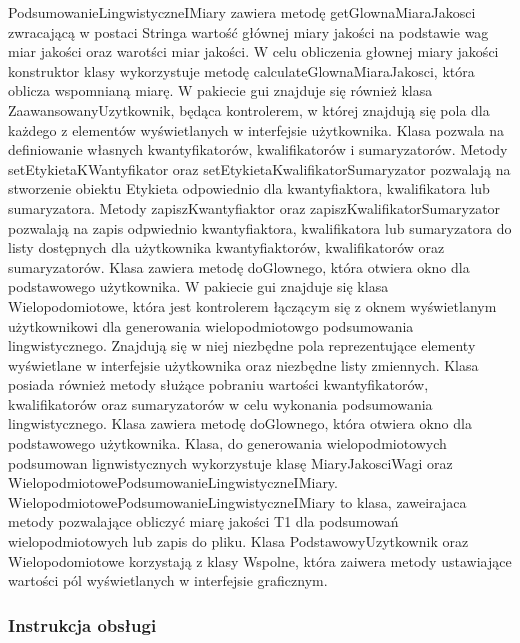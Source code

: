 \documentclass{classrep}
\begin{document}
PodsumowanieLingwistyczneIMiary zawiera metodę getGlownaMiaraJakosci zwracającą w postaci Stringa wartość głównej miary jakości na podstawie wag miar jakości oraz warotści miar jakości. W celu obliczenia głownej miary jakości konstruktor klasy wykorzystuje metodę calculateGlownaMiaraJakosci, która oblicza wspomnianą miarę. W pakiecie gui znajduje się również klasa ZaawansowanyUzytkownik, będąca kontrolerem, w której znajdują się pola dla każdego z elementów wyświetlanych w interfejsie użytkownika. Klasa pozwala na definiowanie własnych kwantyfikatorów, kwalifikatorów i sumaryzatorów. Metody setEtykietaKWantyfikator oraz setEtykietaKwalifikatorSumaryzator pozwalają na stworzenie obiektu Etykieta odpowiednio dla kwantyfiaktora, kwalifikatora lub sumaryzatora. Metody zapiszKwantyfiaktor oraz zapiszKwalifikatorSumaryzator pozwalają na zapis odpwiednio kwantyfiaktora, kwalifikatora lub sumaryzatora do listy dostępnych dla użytkownika kwantyfiaktorów, kwalifikatorów oraz sumaryzatorów. Klasa zawiera metodę doGlownego, która otwiera okno dla podstawowego użytkownika. W pakiecie gui znajduje się klasa Wielopodomiotowe, która jest kontrolerem łączącym się z oknem wyświetlanym użytkownikowi dla generowania wielopodmiotowgo podsumowania lingwistycznego. Znajdują się w niej niezbędne pola reprezentujące elementy wyświetlane w interfejsie użytkownika oraz niezbędne listy zmiennych. Klasa posiada również metody służące pobraniu wartości kwantyfikatorów, kwalifikatorów oraz sumaryzatorów w celu wykonania podsumowania lingwistycznego. Klasa zawiera metodę doGlownego, która otwiera okno dla podstawowego użytkownika. Klasa, do generowania wielopodmiotowych podsumowan lignwistycznych wykorzystuje klasę MiaryJakosciWagi oraz WielopodmiotowePodsumowanieLingwistyczneIMiary. WielopodmiotowePodsumowanieLingwistyczneIMiary to klasa, zaweirajaca metody pozwalające obliczyć miarę jakości T1 dla podsumowań wielopodmiotowych lub zapis do pliku. Klasa PodstawowyUzytkownik oraz Wielopodomiotowe korzystają z klasy Wspolne, która zaiwera metody ustawiające wartości pól wyświetlanych w interfejsie graficznym. 


\newpage


\subsubsection{Instrukcja obsługi}
\end{document}
